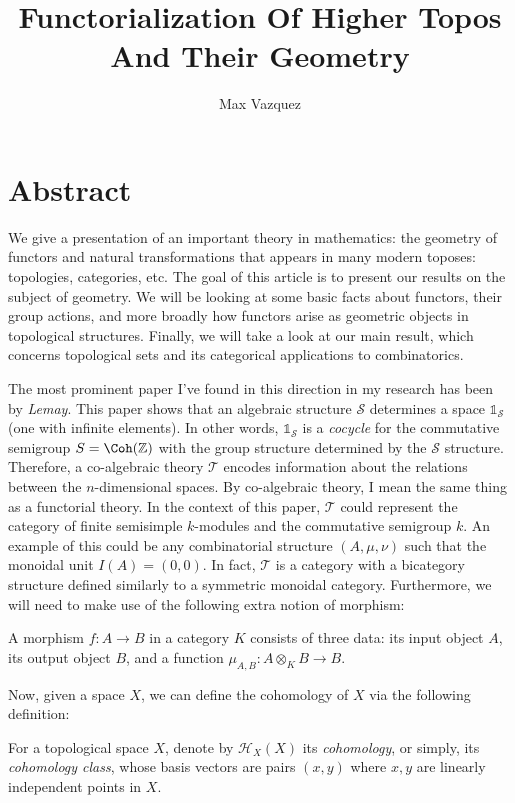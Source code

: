\documentclass[a4paper,reqno,oneside]{article}
\begin{document}
\title{Functorialization Of Higher Topos And Their Geometry}
\author{Max Vazquez}
\maketitle


\section*{Abstract}
We give a presentation of an important theory in mathematics: the geometry of functors and natural transformations that appears in many modern toposes: topologies, categories, etc.
The goal of this article is to present our results on the subject of geometry. We will be looking at some basic facts about functors, their group actions, and more broadly how functors arise as geometric objects in topological structures. Finally, we will take a look at our main result, which concerns topological sets and its categorical applications to combinatorics.

The most prominent paper I've found in this direction in my research has been by \textit{Lemay}. This paper shows that an algebraic structure $\mathcal S$ determines a space $\mathbb 1_{\mathcal S}$ (one with infinite elements). In other words, $\mathbb 1_{\mathcal S}$ is a \textit{cocycle} for the commutative semigroup $S = \Coh(\mathbb Z)$ with the group structure determined by the $\mathcal S$ structure. Therefore, a co-algebraic theory $\mathcal T$ encodes information about the relations between the $n$-dimensional spaces. By co-algebraic theory, I mean the same thing as a functorial theory.
%
In the context of this paper, $\mathcal T$ could represent the category of finite semisimple $k$-modules and the commutative semigroup $k$. An example of this could be any combinatorial structure $(A, \mu, \nu)$ such that the monoidal unit $I(A) = (0, 0)$.
In fact, $\mathcal T$ is a category with a bicategory structure defined similarly to a symmetric monoidal category. Furthermore, we will need to make use of the following extra notion of morphism:
%
\begin{definition}[Morphisms]
  A morphism $f : A \to B$ in a category $K$ consists of three data: its input object $A$, its output object $B$, and a function $\mu_{A,B} : A \otimes_K B \to B$.
\end{definition}

Now, given a space $X$, we can define the cohomology of $X$ via the following definition:
\begin{definition}[Cohomology]
	For a topological space $X$, denote by $\mathcal H_X(X)$ its \textit{cohomology}, or simply, its \textit{cohomology class}, whose basis vectors are pairs $(x,y)$ where $x, y$ are linearly independent points in $X$.
\end{definition}
\end{document}
